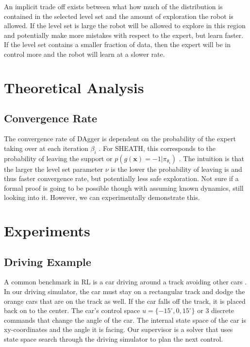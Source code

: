 \documentclass[10pt, conference]{ieeeconf}      %
\begin{document}
An implicit trade off exists between what how much of the distribution is contained in the selected level set and the amount of exploration the robot is allowed. If the level set is large the robot will be allowed to explore in this region and potentially make more mistakes with respect to the expert, but learn faster. If the level set contains a smaller fraction of data, then the expert will be in control more and the robot will learn at a slower rate. 


\section{Theoretical Analysis}

\subsection{Convergence Rate}
The convergence rate of DAgger is dependent on the probability of the expert taking over at each iteration $\beta_i$ \cite{ross2010reduction}. For SHEATH, this corresponds to the probability of leaving the support or $p(g(\mathbf{x}) = -1|\pi_{\theta_i})$ . The intuition is that the larger the level set parameter $\nu$ is the lower the probability of leaving is and thus faster convergence rate, but potentially less safe exploration. Not sure if a formal proof is going to be possible though with assuming known dynamics, still looking into it. However, we can experimentally demonstrate this. 




\section{Experiments}
\subsection{Driving Example}
A common benchmark in RL is a car driving around a track avoiding other cars \cite{argall2009survey}. In our driving simulator, the car must stay on a rectangular track and dodge the orange cars that are on the track as well. If the car falls off the track, it is placed back on to the center. The car's control space $u = \lbrace -15^\circ, 0, 15^\circ \rbrace$ or 3 discrete commands that change the angle of the car. The internal state space of the car is xy-coordinates and the angle it is facing. Our supervisor is a solver that uses state space search through the driving simulator to plan the next control.
\end{document}
